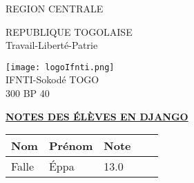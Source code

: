 \documentclass[10pt,a4paper]{article}
\begin{document}
\begin{minipage}{12cm}
\textsf{REGION CENTRALE} \\ \hspace{1cm}
\end{minipage}
\begin{minipage}{5cm}
REPUBLIQUE TOGOLAISE\\
Travail-Liberté-Patrie
\end{minipage}
\begin{minipage}{3cm}
    \begin{center}
    \texttt{[image: logoIfnti.png]} \\ \hspace{1cm}
    IFNTI-Sokodé TOGO\\300 BP 40
    \end{center}
    \end{minipage}
    \begin{center}
        \underline{\textbf{NOTES DES ÉLÈVES EN DJANGO}}
        \end{center}
        \begin{longtable}{|l|l|l|l|l|} \hline
        \textbf{Nom} & \textbf{Prénom} & \textbf{Note} \\ \hline
        
        Falle & Éppa  & 13.0 \\ \hline
        
        \end{longtable}
\end{document}
